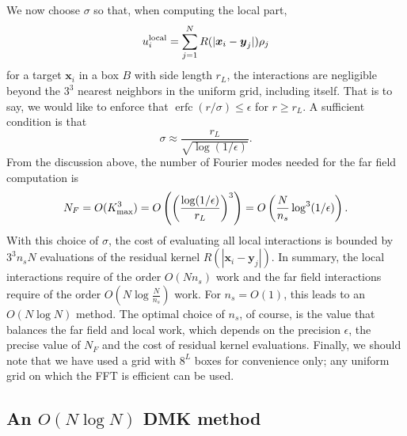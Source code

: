 \documentclass[final,letterpaper]{siamart171218}
\DeclareMathOperator\erfc{erfc}
\newcommand{\be}{\begin{equation}}
\newcommand{\ee}{\end{equation}}
\newcommand{\x}{\boldsymbol{x}}
\newcommand{\y}{\boldsymbol{y}}
\newcommand{\acron}{DMK }
\newcommand{\cR}{r}
\begin{document}
We now choose $\sigma$ so that, when computing the local part,
\[
u_{i}^{\rm local} =
\sum_{j=1}^{N}R(|\x_i-\y_j|)\rho_j
\]
for a target $\x_i$ in a box $B$ with side length $\cR_L$, the interactions
are negligible beyond the $3^3$ nearest neighbors 
in the uniform grid, including itself.
That is to say, we would like to enforce that
$\erfc(r/\sigma) \le \epsilon$
for $r \geq \cR_L$. A sufficient condition is that
\be\label{femdeltavalue}
\sigma \approx \frac{\cR_L}{\sqrt{\log(1/\epsilon)}}.
\ee
From the discussion above, the number of Fourier modes needed for the 
far field computation is 
\be
N_F = O(K_{\rm max}^3) =  O \left( \left( \frac{\log(1/\epsilon)}{\cR_L} \right)^3 \right)
= O\left(\frac{N}{n_s} \log^3(1/\epsilon)\right).
\ee
With this choice of $\sigma$,
the cost of evaluating all local interactions is bounded
by $3^3 n_s N$ evaluations of the residual kernel $R(|\x_i-\y_j|)$.
In summary, the local interactions require of the order
$O(N n_s)$ work and the far field interactions require of the order 
$O( N\log \frac{N}{n_s})$ work. For $n_s = O(1)$, this
leads to an $O(N \log N)$ method.
The optimal choice of $n_s$, of course, is the value 
that balances the far field and local work,
which depends on the precision $\epsilon$, the precise value of $N_F$
and the cost of residual kernel evaluations.
Finally, we should note that
we have used a grid with $8^{L}$ boxes for convenience only; any uniform grid
on which the FFT is efficient can be used.

\subsection{An $O(N \log N)$ \acron method}\label{sec:afem}
\end{document}
